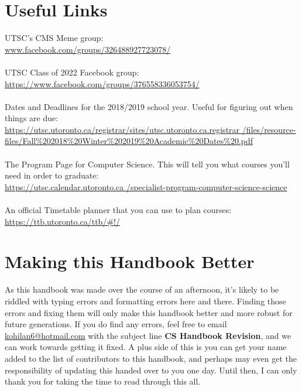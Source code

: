 \documentclass[11pt]{article}
\begin{document}
\section{Useful Links}
UTSC's CMS Meme group:\\
\url{www.facebook.com/groups/326488927723078/}\\\\
UTSC Class of 2022 Facebook group:\\
\url{https://www.facebook.com/groups/376558336053754/}\\\\
Dates and Deadlines for the 2018/2019 school year. 
Useful for figuring out when things are due:\\ 
\url{https://utsc.utoronto.ca/registrar/sites/utsc.utoronto.ca.registrar
/files/resource-files/Fall%
The Program Page for Computer Science.  
This will tell you what courses you'll need in order to graduate:\\ 
\url{https://utsc.calendar.utoronto.ca
/specialist-program-computer-science-science}\\\\
An official Timetable planner that you can use to plan courses:\\
\url{https://ttb.utoronto.ca/ttb/#!/}

\section{Making this Handbook Better}
As this handbook was made over the course of an afternoon, it's likely
to be riddled with typing errors and formatting errors here and there.
Finding those errors and fixing them will only make this handbook better
and more robust for future generations. If you do find any errors, feel
free to email \href{ mailto:kohilan6@hotmail.com}{kohilan6@hotmail.com}
with the subject line \textbf{CS Handbook Revision}, and we can work
towards getting it fixed. A plus side of this is you can get your name
added to the list of contributors to this handbook, and perhaps may even
get the responsibility of updating this handed over to you one day.
Until then, I can only thank you for taking the time to read through
this all.
\end{document}
